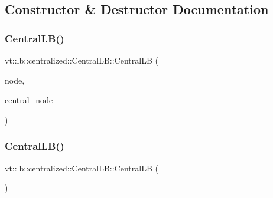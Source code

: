 \subsection{Constructor \& Destructor Documentation}
\mbox{\label{structvt_1_1lb_1_1centralized_1_1_central_l_b_a6d9fc1b18d9324ed7b4fde9b4402f362}} 
\subsubsection{\texorpdfstring{Central\+L\+B()}{CentralLB()}\hspace{0.1cm}{\footnotesize\ttfamily [1/3]}}
{\footnotesize\ttfamily vt\+::lb\+::centralized\+::\+Central\+L\+B\+::\+Central\+LB (\begin{DoxyParamCaption}\item[{\hyperlink{namespacevt_a866da9d0efc19c0a1ce79e9e492f47e2}{Node\+Type} const \&}]{node,  }\item[{\hyperlink{namespacevt_a866da9d0efc19c0a1ce79e9e492f47e2}{Node\+Type} const \&}]{central\+\_\+node }\end{DoxyParamCaption})\hspace{0.3cm}{\ttfamily [inline]}}

\mbox{\label{structvt_1_1lb_1_1centralized_1_1_central_l_b_aa0fcbec516d85fc7fbdfe2ac436d3dc7}} 
\subsubsection{\texorpdfstring{Central\+L\+B()}{CentralLB()}\hspace{0.1cm}{\footnotesize\ttfamily [2/3]}}
{\footnotesize\ttfamily vt\+::lb\+::centralized\+::\+Central\+L\+B\+::\+Central\+LB (\begin{DoxyParamCaption}\item[{\hyperlink{structvt_1_1lb_1_1centralized_1_1_central_l_b}{Central\+LB} const \&}]{ }\end{DoxyParamCaption})\hspace{0.3cm}{\ttfamily [delete]}}

